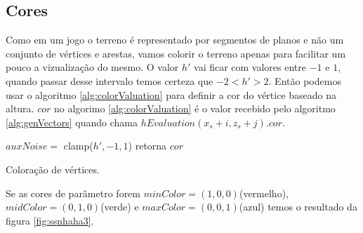 \subsection{Cores}
Como em um jogo o terreno é representado por segmentos de planos e não um conjunto
de vértices e arestas, vamos colorir o terreno apenas para facilitar um pouco a
vizualização do mesmo. O valor $h'$ vai ficar com valores entre $-1$ e $1$, 
quando passar desse intervalo temos certeza que $-2 < h' > 2$.
Então podemos
usar o algoritmo \ref{alg:colorValuation} para definir a cor do vértice baseado na altura.
$cor$ no algorimo \ref{alg:colorValuation} é o valor recebido pelo algoritmo \ref{alg:genVectors}
quando chama $hEvaluation(x_{s} + i, z_{s} + j).cor$.

\begin{algorithm}[H]\label{alg:colorValuation}
    $auxNoise =$ clamp($h', -1, 1$)\;
    retorna $cor$\;
    \caption{Coloração de vértices.}
\end{algorithm}

Se as cores de parâmetro forem $minColor = (1, 0, 0)$(vermelho), $midColor = (0, 1, 0)$(verde) e $maxColor = (0, 0, 1)$(azul)
temos o resultado da figura \ref{fig:ssnhaha3}.

